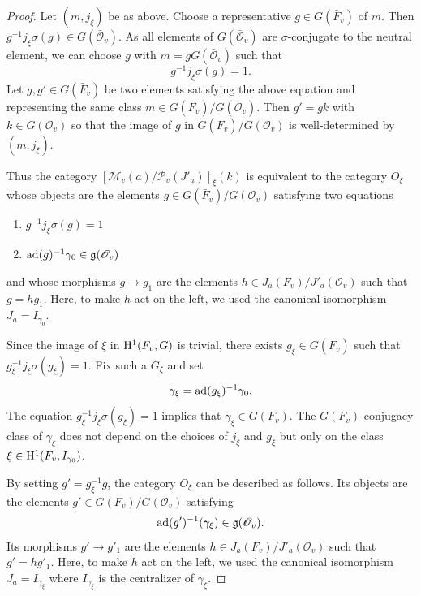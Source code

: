 \documentclass[12pt,english]{smfart}
\numberwithin{equation}{subsection}
\theoremstyle{remark}
\newcommand\calP{{\mathscr P}}
\newcommand\calM{{\mathscr M}}
\newcommand\calO{{\mathscr O}}
\newcommand\frakg{{\mathfrak g}}
\newcommand\rmH{{\rm H}}
\newcommand\ad{{\rm ad}}
\begin{document}
\begin{proof}
Let $(m,j_\xi)$ be as above. Choose a representative $g\in G(\bar
F_v)$ of $m$. Then $g^{-1} j_\xi \sigma(g) \in G(\bar\calO_v)$. As
all elements of $G(\bar\calO_v)$ are $\sigma$-conjugate to the
neutral element, we can choose $g$ with $m=g G(\bar\calO_v)$ such that
$$g^{-1} j_\xi \sigma(g)=1.$$
Let $g,g' \in G(\bar F_v)$ be two elements satisfying the above
equation and representing the same class $m\in G(\bar F_v)/
G(\bar\calO_v)$. Then $g'=g k$ with $k\in G(\calO_v)$ so that the image
of $g$ in $G(\bar F_v)/ G(\calO_v)$ is well-determined by
$(m,j_\xi)$.

Thus the category $[\calM_v(a)/\calP_v(J'_a)]_\xi(k)$ is equivalent to
the category $O_\xi$ whose objects are the elements $g\in G(\bar F_v)/
G(\calO_v)$ satisfying two equations
\begin{enumerate}
  \item $g^{-1} j_\xi \sigma(g)=1$
  \item $\ad(g)^{-1} \gamma_0 \in \frakg(\bar\calO_v)$
\end{enumerate}
and whose morphisms $g \rightarrow g_1$ are the elements $h\in
J_a(F_v)/J'_a(\calO_v)$ such that $g=hg_1$. Here, to make $h$ act on the
left, we used the canonical isomorphism $J_a=I_{\gamma_0}$.

Since the image of $\xi$ in $\rmH^1(F_v,G)$ is trivial, there exists
$g_\xi\in G(\bar F_v)$ such that $g_\xi^{-1}j_\xi \sigma(g_\xi)=1$. Fix such a
$G_\xi$ and set
$$\gamma_\xi=\ad(g_\xi)^{-1} \gamma_0.$$
The equation $g_\xi^{-1}j_\xi \sigma(g_\xi)=1$ implies that $\gamma_\xi \in
G(F_v)$. The $G(F_v)$-conjugacy class of $\gamma_\xi$ does not depend
on the choices of $j_\xi$ and $g_\xi$ but only on the class $\xi\in
\rmH^1(F_v,I_{\gamma_0})$.

By setting $g'=g_\xi^{-1} g$, the category $O_\xi$ can be described
as follows. Its objects are the elements $g'\in G(F_v)/ G(\calO_v)$
satisfying
$$\ad(g')^{-1}(\gamma_\xi)\in \frakg(\calO_v).$$
Its morphisms $g'\rightarrow g'_1$ are the elements $h\in
J_a(F_v)/J'_a(\calO_v)$ such that $g'=hg'_1$. Here, to make $h$ act on the
left, we used the canonical isomorphism $J_a=I_{\gamma_\xi}$ where
$I_{\gamma_\xi}$ is the centralizer of $\gamma_\xi$.


\end{proof}
\end{document}
